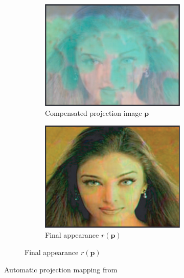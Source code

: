 \begin{figure}
\begin{subfigure}{0.9\textwidth}
        \begin{subfigure}{0.34\textwidth}
            \centering
            \includegraphics[width=\textwidth]{images/01-grossberg-compensation_image.jpg}
            \caption{Compensated projection image \(\bm{p}\)}
            \label{fig:intro_grossberg-compensation}
        \end{subfigure}
        \hfill
        \begin{subfigure}{0.34\textwidth}
            \centering
            \includegraphics[width=\textwidth]{images/01-grossberg-new_appearance.jpg}
            \caption{Final appearance \(r(\bm{p})\)}
            \label{fig:intro_grossberg-new_appearance}
        \end{subfigure}
    \end{subfigure}
    \caption{Automatic projection mapping from \citet{Grossberg2004}}
    \label{fig:intro_grossberg}
\end{figure}

